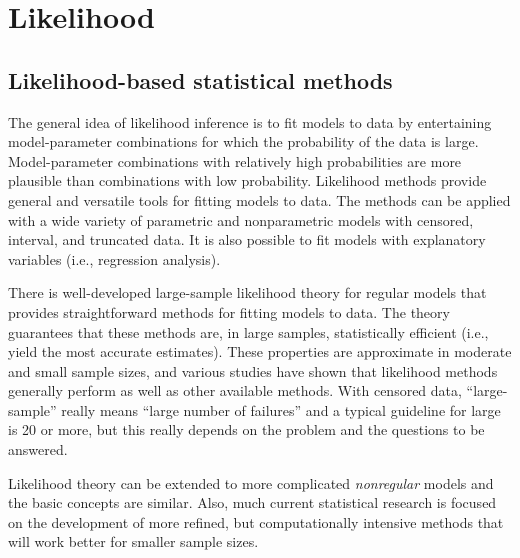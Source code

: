  \section{Likelihood}
\label{section:general.likelihood}
\subsection{Likelihood-based statistical methods}

The general idea of likelihood inference is to
fit models to data by entertaining
model-parameter combinations for which the probability of the data is
large.  Model-parameter combinations with relatively high
probabilities are more plausible than combinations with low
probability.  Likelihood methods provide general and versatile tools
for fitting models to data.  The methods can be applied with a wide
variety of parametric and nonparametric models with censored,
interval, and truncated data.  It is also possible to fit models with
explanatory variables (i.e., regression analysis).

There is well-developed large-sample likelihood theory for
regular models that provides straightforward methods for fitting models
to data. The theory guarantees that these methods are, in large
samples, statistically efficient (i.e., yield the most
accurate estimates). These properties are approximate in moderate and
small sample sizes, and various studies have shown that likelihood
methods generally perform as well as other available methods. With
censored data, ``large-sample'' really means ``large number of
failures'' and a typical guideline for large is 20 or more, but
this really depends on the problem and the questions to be answered.

Likelihood theory can be extended to more complicated {\em nonregular}
models and the basic concepts are similar.  Also, much current
statistical research is focused on the development of more refined,
but computationally intensive methods that will work better for
smaller sample sizes.



